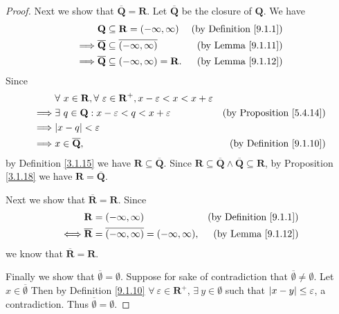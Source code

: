 \begin{proof}
    Next we show that \(\overline{\mathbf{Q}} = \mathbf{R}\).
    Let \(\overline{\mathbf{Q}}\) be the closure of \(\mathbf{Q}\).
    We have
    \begin{align*}
                 & \mathbf{Q} \subseteq \mathbf{R} = (-\infty, \infty)             & \text{(by Definition \ref{9.1.1})} \\
        \implies & \overline{\mathbf{Q}} \subseteq \overline{(-\infty, \infty)}    & \text{(by Lemma \ref{9.1.11})}     \\
        \implies & \overline{\mathbf{Q}} \subseteq (-\infty, \infty) = \mathbf{R}. & \text{(by Lemma \ref{9.1.12})}
    \end{align*}
    Since
    \begin{align*}
                 & \forall\ x \in \mathbf{R}, \forall\ \varepsilon \in \mathbf{R}^+, x - \varepsilon < x < x + \varepsilon                                        \\
        \implies & \exists\ q \in \mathbf{Q} : x - \varepsilon < q < x + \varepsilon                                       & \text{(by Proposition \ref{5.4.14})} \\
        \implies & \abs*{x - q} < \varepsilon                                                                                                                     \\
        \implies & x \in \overline{\mathbf{Q}},                                                                            & \text{(by Definition \ref{9.1.10})}
    \end{align*}
    by Definition \ref{3.1.15} we have \(\mathbf{R} \subseteq \overline{\mathbf{Q}}\).
    Since \(\mathbf{R} \subseteq \overline{\mathbf{Q}} \land \overline{\mathbf{Q}} \subseteq \mathbf{R}\), by Proposition \ref{3.1.18} we have \(\mathbf{R} = \overline{\mathbf{Q}}\).

    Next we show that \(\overline{\mathbf{R}} = \mathbf{R}\).
    Since
    \begin{align*}
             & \mathbf{R} = (-\infty, \infty)                                            & \text{(by Definition \ref{9.1.1})} \\
        \iff & \overline{\mathbf{R}} = \overline{(-\infty, \infty)} = (-\infty, \infty), & \text{(by Lemma \ref{9.1.12})}
    \end{align*}
    we know that \(\overline{\mathbf{R}} = \mathbf{R}\).

    Finally we show that \(\overline{\emptyset} = \emptyset\).
    Suppose for sake of contradiction that \(\overline{\emptyset} \neq \emptyset\).
    Let \(x \in \overline{\emptyset}\)
    Then by Definition \ref{9.1.10} \(\forall\ \varepsilon \in \mathbf{R}^+\), \(\exists\ y \in \emptyset\) such that \(\abs*{x - y} \leq \varepsilon\), a contradiction.
    Thus \(\overline{\emptyset} = \emptyset\).
\end{proof}

